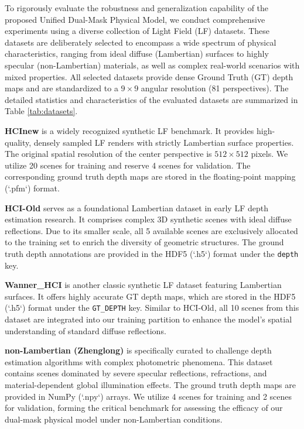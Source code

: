 \documentclass[lettersize,journal]{IEEEtran}
\begin{document}
To rigorously evaluate the robustness and generalization capability of the proposed Unified Dual-Mask Physical Model, we conduct comprehensive experiments using a diverse collection of Light Field (LF) datasets. These datasets are deliberately selected to encompass a wide spectrum of physical characteristics, ranging from ideal diffuse (Lambertian) surfaces to highly specular (non-Lambertian) materials, as well as complex real-world scenarios with mixed properties. All selected datasets provide dense Ground Truth (GT) depth maps and are standardized to a $9 \times 9$ angular resolution (81 perspectives). The detailed statistics and characteristics of the evaluated datasets are summarized in Table \ref{tab:datasets}.

\textbf{HCInew}  is a widely recognized synthetic LF benchmark. It provides high-quality, densely sampled LF renders with strictly Lambertian surface properties. The original spatial resolution of the center perspective is $512 \times 512$ pixels. We utilize 20 scenes for training and reserve 4 scenes for validation. The corresponding ground truth depth maps are stored in the floating-point mapping (`.pfm`) format. 

\textbf{HCI-Old}  serves as a foundational Lambertian dataset in early LF depth estimation research. It comprises complex 3D synthetic scenes with ideal diffuse reflections. Due to its smaller scale, all 5 available scenes are exclusively allocated to the training set to enrich the diversity of geometric structures. The ground truth depth annotations are provided in the HDF5 (`.h5`) format under the \texttt{depth} key.

\textbf{Wanner\_HCI}  is another classic synthetic LF dataset featuring Lambertian surfaces. It offers highly accurate GT depth maps, which are stored in the HDF5 (`.h5`) format under the \texttt{GT\_DEPTH} key. Similar to HCI-Old, all 10 scenes from this dataset are integrated into our training partition to enhance the model's spatial understanding of standard diffuse reflections.

\textbf{non-Lambertian (Zhenglong)}  is specifically curated to challenge depth estimation algorithms with complex photometric phenomena. This dataset contains scenes dominated by severe specular reflections, refractions, and material-dependent global illumination effects. The ground truth depth maps are provided in NumPy (`.npy`) arrays. We utilize 4 scenes for training and 2 scenes for validation, forming the critical benchmark for assessing the efficacy of our dual-mask physical model under non-Lambertian conditions.
\end{document}
